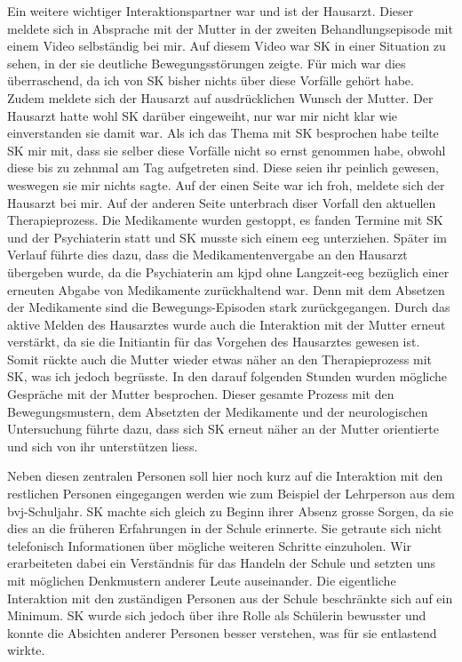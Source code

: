 Ein weitere wichtiger Interaktionspartner war und ist der Hausarzt. Dieser meldete sich in Absprache mit der Mutter in der zweiten Behandlungsepisode mit einem Video selbständig bei mir. Auf diesem Video war SK in einer Situation zu sehen, in der sie deutliche Bewegungsstörungen zeigte. Für mich war dies überraschend, da ich von SK bisher nichts über diese Vorfälle gehört habe. Zudem meldete sich der Hausarzt auf ausdrücklichen Wunsch der Mutter. Der Hausarzt hatte wohl SK darüber eingeweiht, nur war mir nicht klar wie einverstanden sie damit war. Als ich das Thema mit SK besprochen habe teilte SK mir mit, dass sie selber diese Vorfälle nicht so ernst genommen habe, obwohl diese bis zu zehnmal am Tag aufgetreten sind. Diese seien ihr peinlich gewesen, weswegen sie mir nichts sagte. Auf der einen Seite war ich froh, meldete sich der Hausarzt bei mir. Auf der anderen Seite unterbrach diser Vorfall den aktuellen Therapieprozess. Die Medikamente wurden gestoppt, es fanden Termine mit SK und der Psychiaterin statt und SK musste sich einem \ac{eeg} unterziehen. Später im Verlauf führte dies dazu, dass die Medikamentenvergabe an den Hausarzt übergeben wurde, da die Psychiaterin am \ac{kjpd} ohne Langzeit-\ac{eeg} bezüglich einer erneuten Abgabe von Medikamente zurückhaltend war. Denn mit dem Absetzen der Medikamente sind die Bewegungs-Episoden stark zurückgegangen. Durch das aktive Melden des Hausarztes wurde auch die Interaktion mit der Mutter erneut verstärkt, da sie die Initiantin für das Vorgehen des Hausarztes gewesen ist. Somit rückte auch die Mutter wieder etwas näher an den Therapieprozess mit SK, was ich jedoch begrüsste. In den darauf folgenden Stunden wurden mögliche Gespräche mit der Mutter besprochen. Dieser gesamte Prozess mit den Bewegungsmustern, dem Absetzten der Medikamente und der neurologischen Untersuchung führte dazu, dass sich SK erneut näher an der Mutter orientierte und sich von ihr unterstützen liess.

Neben diesen zentralen Personen soll hier noch kurz auf die Interaktion mit den restlichen Personen eingegangen werden wie zum Beispiel der Lehrperson aus dem \ac{bvj}-Schuljahr. SK machte sich gleich zu Beginn ihrer Absenz grosse Sorgen, da sie dies an die früheren Erfahrungen in der Schule erinnerte. Sie getraute sich nicht telefonisch Informationen über mögliche weiteren Schritte einzuholen. Wir erarbeiteten dabei ein Verständnis für das Handeln der Schule und setzten uns mit möglichen Denkmustern anderer Leute auseinander. Die eigentliche Interaktion mit den zuständigen Personen aus der Schule beschränkte sich auf ein Minimum. SK wurde sich jedoch über ihre Rolle als Schülerin bewusster und konnte die Absichten anderer Personen besser verstehen, was für sie entlastend wirkte. 

